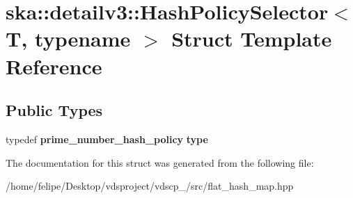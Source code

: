\section{ska\+:\+:detailv3\+:\+:Hash\+Policy\+Selector$<$ T, typename $>$ Struct Template Reference}
\label{structska_1_1detailv3_1_1HashPolicySelector}
\subsection*{Public Types}
\begin{DoxyCompactItemize}
\item 
typedef {\bf prime\+\_\+number\+\_\+hash\+\_\+policy} {\bfseries type}\label{structska_1_1detailv3_1_1HashPolicySelector_a49f01419b9072972f37c66571456957a}

\end{DoxyCompactItemize}


The documentation for this struct was generated from the following file\+:\begin{DoxyCompactItemize}
\item 
/home/felipe/\+Desktop/vdsproject/vdscp\+\_/src/flat\+\_\+hash\+\_\+map.\+hpp\end{DoxyCompactItemize}
